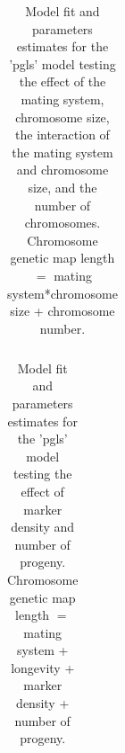 \documentclass{article}
\begin{document}
\begin{table}[h!]
\centering{}
\caption{Model fit and parameters estimates for the 'pgls' model testing the effect of the mating system, chromosome size, the interaction of the mating system and chromosome size, and the number of chromosomes. Chromosome genetic map length $=$ mating system*chromosome size + chromosome number.}
\begin{tabular}{cccccccc}
\end{tabular}
\label{table:tableS3}
\end{table}


\begin{table}[h!]
\centering{}
\caption{Model fit and parameters estimates for the 'pgls' model testing the effect of marker density and number of progeny. Chromosome genetic map length $=$ mating system + longevity + marker density + number of progeny.}
\begin{tabular}{cccccccc}
\end{tabular}
\label{table:tableS4}
\end{table}
\end{document}
